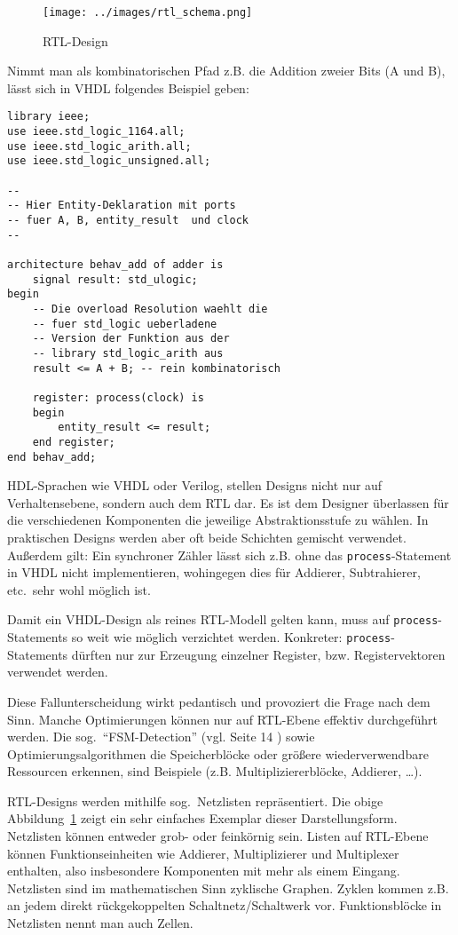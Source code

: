 \documentclass[oneside,a4paper]{article}
\def\VH#1{\lstinline[style=vhdl]{#1}}
\begin{document}
\begin{figure}[H]
  \centering
  \texttt{[image: ../images/rtl\_schema.png]}
  \caption{RTL-Design}
\label{fig:rtl_schema}
\end{figure}

Nimmt man als kombinatorischen Pfad z.B. die Addition zweier Bits (A und B),
lässt sich in VHDL folgendes Beispiel geben:

\begin{lstlisting}[style=vhdl,caption={Reines RTL-Design in VHDL},label=simple]
library ieee;
use ieee.std_logic_1164.all;
use ieee.std_logic_arith.all;
use ieee.std_logic_unsigned.all;

--
-- Hier Entity-Deklaration mit ports
-- fuer A, B, entity_result  und clock
--

architecture behav_add of adder is
    signal result: std_ulogic;
begin
    -- Die overload Resolution waehlt die
    -- fuer std_logic ueberladene
    -- Version der Funktion aus der
    -- library std_logic_arith aus
    result <= A + B; -- rein kombinatorisch

    register: process(clock) is
    begin
        entity_result <= result;
    end register;
end behav_add;
\end{lstlisting}

HDL-Sprachen wie VHDL oder Verilog, stellen Designs nicht nur auf
Verhaltensebene, sondern auch dem RTL dar. Es ist dem Designer überlassen
für die verschiedenen Komponenten die jeweilige Abstraktionsstufe zu
wählen. In praktischen Designs werden aber oft beide Schichten
gemischt verwendet. Außerdem gilt:
Ein synchroner Zähler lässt sich z.B. ohne das
\VH{process}-Statement in VHDL nicht implementieren, wohingegen dies für
Addierer, Subtrahierer, etc.\ sehr wohl möglich ist.

Damit ein VHDL-Design als reines RTL-Modell gelten kann, muss auf \VH{process}-Statements
so weit wie möglich verzichtet werden. Konkreter: \VH{process}-Statements dürften
nur zur Erzeugung einzelner Register, bzw. Registervektoren verwendet werden.

Diese Fallunterscheidung wirkt pedantisch und provoziert die Frage nach dem Sinn.
Manche Optimierungen können
nur auf RTL-Ebene effektiv durchgeführt werden.
Die sog.\ ``FSM-Detection'' (vgl. Seite 14 \cite{WOLF2015})
sowie Optimierungsalgorithmen die Speicherblöcke
oder größere wiederverwendbare
Ressourcen erkennen, sind Beispiele (z.B. Multipliziererblöcke, Addierer, \ldots).

RTL-Designs werden mithilfe sog.\ Netzlisten repräsentiert. Die obige
Abbildung~\ref{fig:rtl_schema} zeigt ein sehr einfaches Exemplar
dieser Darstellungsform.
Netzlisten können entweder
grob- oder feinkörnig sein. Listen auf RTL-Ebene können Funktionseinheiten
wie Addierer, Multiplizierer und Multiplexer enthalten, also insbesondere
Komponenten mit mehr als einem Eingang. Netzlisten sind im mathematischen Sinn
zyklische Graphen. Zyklen kommen z.B. an jedem direkt rückgekoppelten Schaltnetz/Schaltwerk
vor. Funktionsblöcke in Netzlisten nennt man auch Zellen.
\end{document}
